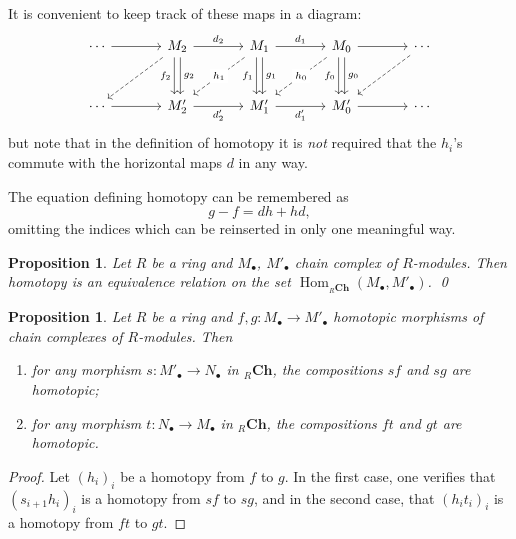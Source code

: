 \documentclass[11pt]{amsbook}
\DeclareMathOperator\Hom{Hom}
\def\Ch{\mathbf{Ch}}
\theoremstyle{plain}
\newtheorem{proposition}[theorem]{Proposition}
\theoremstyle{definition}
\begin{document}
It is convenient to keep track of these maps in a diagram:
\[
\begin{tikzcd}[row sep=large, column sep=large]
\cdots \arrow{r}
	& M_{2} \arrow{r}{d_{2}} 
		\arrow[transform canvas={xshift=-.5ex},swap]{d}{f_{2}} 
		\arrow[transform canvas={xshift=.5ex}]{d}{g_{2}} 
		\arrow[dashed]{dl}{}
	& M_{1} \arrow{r}{d_{1}}  
		\arrow[transform canvas={xshift=-.5ex},swap]{d}{f_{1}} 
		\arrow[transform canvas={xshift=.5ex}]{d}{g_{1}} 
		\arrow[dashed]{dl}[description]{h_1}
	& M_{0} \arrow{r} 
		\arrow[transform canvas={xshift=-.5ex},swap]{d}{f_{0}} 
		\arrow[transform canvas={xshift=.5ex}]{d}{g_{0}} 
		\arrow[dashed]{dl}[description]{h_0}
	& \cdots \arrow[dashed]{dl}{} \\
\cdots \arrow{r}
	& M'_{2} \arrow[swap]{r}{d'_{2}} 
	& M'_{1} \arrow[swap]{r}{d'_{1}} 
	& M'_{0} \arrow[swap]{r} 
	& \cdots 
\end{tikzcd}
\]
but note that in the definition of homotopy it is \emph{not} required that the $h_i$'s commute with the horizontal maps $d$ in any way.

The equation defining homotopy can be remembered as
\[
	g-f=dh+hd,
\]
omitting the indices which can be reinserted in only one meaningful way. 

\begin{proposition}\label{prop:homotopy-equivalence-relation}
Let $R$ be a ring and $M_\bullet$, $M'_\bullet$ chain complex of $R$-modules. Then homotopy is an equivalence relation on the set
 $\Hom_{{}_R\Ch}(M_\bullet,M'_\bullet)$. \qed
\end{proposition}



\begin{proposition}\label{prop:homotopy-composition}
Let $R$ be a ring and $f,g \colon M_\bullet \to M'_\bullet$ homotopic morphisms of chain complexes of $R$-modules. Then
\begin{enumerate}
\item for any morphism $s\colon M'_\bullet \to N_\bullet$ in ${}_R\Ch$, the compositions $sf$ and $sg$ are homotopic;
\item for any morphism $t\colon N_\bullet \to M_\bullet$ in ${}_R\Ch$, the compositions $ft$ and $gt$ are homotopic.
\end{enumerate}
\end{proposition}


\begin{proof}
Let $(h_i)_i$ be a homotopy from $f$ to $g$. In the first case, one  verifies that $(s_{i+1}h_i)_i$ is a homotopy from $sf$ to $sg$, and in the second case,  that $(h_it_i)_i$ is a homotopy from $ft$ to $gt$. 
\end{proof}
\end{document}
